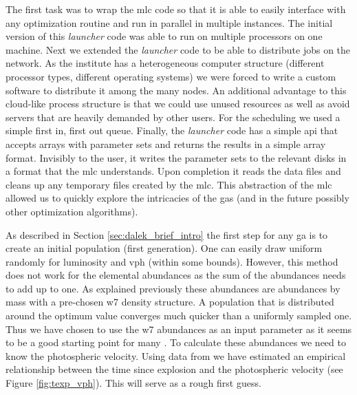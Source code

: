 The first task was to wrap the \gls{mlc} code so that it is able to easily interface with any optimization routine and run in parallel in multiple instances. The initial version of this \emph{launcher} code was able to run on multiple processors on one machine. Next we extended the \emph{launcher} code to be able to distribute jobs on the network. As the institute has a heterogeneous computer structure (different processor types, different operating systems) we were forced to write a custom software to distribute it among the many nodes. An additional advantage to this cloud-like process structure is that we could use unused resources as well as avoid servers that are heavily demanded by other users. For the scheduling we used a simple first in, first out queue. Finally, the \emph{launcher} code has a simple \gls{api} that accepts arrays with parameter sets and returns the results in a simple array format. Invisibly to the user, it writes the parameter sets to the relevant disks in a format that the \gls{mlc} understands. Upon completion it reads the data files and cleans up any temporary files created by the \gls{mlc}. This abstraction of the \gls{mlc} allowed us to quickly explore the intricacies of the \glspl{ga} (and in the future possibly other optimization algorithms).


As described in Section \ref{sec:dalek_brief_intro} the first step for any \gls{ga} is to create an initial population (first generation). One can easily draw uniform randomly for luminosity and \gls{vph} (within some bounds). However, this method does not work for the elemental abundances as the sum of the abundances needs to add up to one. As explained previously these abundances are abundances by mass with a pre-chosen \gls{w7} density structure. A population that is distributed around the optimum value converges much quicker than a uniformly sampled one. Thus we have chosen to use the \gls{w7} abundances as an input parameter as it seems to be a good starting point for many \snia. To calculate these abundances we need to know the photospheric velocity. Using data from \citet{2005ApJ...623.1011B} we have estimated an empirical relationship between the time since explosion and the photospheric velocity (see Figure \ref{fig:texp_vph}). This will serve as a rough first guess.

